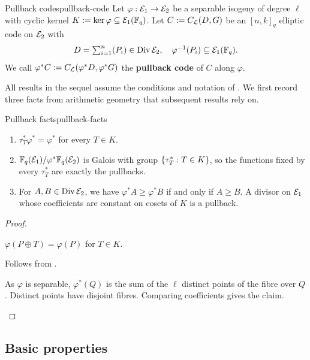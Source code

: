 \documentclass[twocolumn, 11pt]{scrartcl}
\begin{document}
\begin{definition}{Pullback codes}{pullback-code}
    Let $\varphi:\mathcal{E}_1\to\mathcal{E}_2$ be a separable isogeny of degree $\ell$ with cyclic kernel $K:=\ker\varphi\subseteq\mathcal{E}_1(\mathbb{F}_q)$. Let $C:=C_\mathcal{L}(D,G)$ be an $[n,k]_q$ elliptic code on $\mathcal{E}_2$ with
    \[ \textstyle D=\sum_{i=1}^n (P_i)\in\operatorname{Div}\mathcal{E}_2,\quad \varphi^{-1}(P_i)\subseteq\mathcal{E}_1(\mathbb{F}_q). \]
    We call $\varphi^*C:=C_\mathcal{L}(\varphi^*D,\varphi^*G)$ the \textbf{pullback code} of $C$ along $\varphi$.
\end{definition}

All results in the sequel assume the conditions and notation of . We first record three facts from arithmetic geometry that subsequent results rely on.

\begin{lemma}{Pullback facts}{pullback-facts}
    \begin{enumerate}[label={(\alph*)}, left=-4pt, topsep=-10pt, itemsep=-3pt]
        \item \label{enum:pf-translation} $\tau_T^*\varphi^*=\varphi^*$ for every $T\in K$.
        \item \label{enum:pf-galois} $\mathbb{F}_q(\mathcal{E}_1)/\varphi^*\mathbb{F}_q(\mathcal{E}_2)$ is Galois with group $\{\tau_T^*:T\in K\}$, so the functions fixed by every $\tau_T^*$ are exactly the pullbacks.
        \item \label{enum:pf-divisors} For $A,B\in\operatorname{Div}\mathcal{E}_2$, we have $\varphi^*A\geq\varphi^*B$ if and only if $A\geq B$. A divisor on $\mathcal{E}_1$ whose coefficients are constant on cosets of $K$ is a pullback.
    \end{enumerate}
\end{lemma}

\begin{proof}
\begin{enumerate*}[label={(\alph*)}]
    \item $\varphi(P\oplus T)=\varphi(P)$ for $T\in K$.
    \item Follows from \cite[Thm.~III.4.10]{silverman2009arithmetic}.
    \item As $\varphi$ is separable, $\varphi^*(Q)$ is the sum of the $\ell$ distinct points of the fibre over $Q$. Distinct points have disjoint fibres. Comparing coefficients gives the claim. \qedhere
\end{enumerate*}
\end{proof}

\subsection{Basic properties} \label{subsection:basic-prop}
\end{document}
